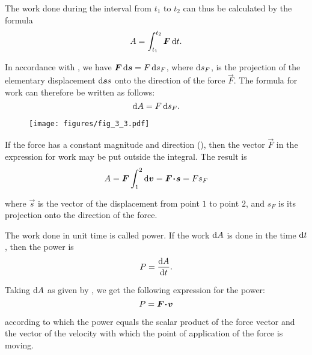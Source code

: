 \noindent
The work done during the interval from $t_1$ to $t_2$ can thus be calculated by the formula
\begin{equation}\label{eq:3_17}
A = \int_{t_1}^{t_2}\boldsymbol{F}\,\mathrm{d} t.
\end{equation}

In accordance with , we have $\boldsymbol{F}\,\mathrm{d}\boldsymbol{s}=F\,\mathrm{d} s_F$, where $\mathrm{d} s_F$, is the projection of the elementary displacement $\mathrm{d}\boldsymbol{s}s$ onto the direction of the force $\vec{F}$. The formula for work can therefore be written as follows:
\begin{equation}\label{eq:3_18}
\mathrm{d} A = F\,\mathrm{d} s_F.
\end{equation}

\begin{figure}[t]
	\begin{center}
		\texttt{[image: figures/fig\_3\_3.pdf]}
		\caption[]{}
		\label{fig:3_3}
	\end{center}
	\vspace{-0.7cm}
\end{figure}

If the force has a constant magnitude and direction (), then the vector $\vec{F}$ in the expression for work may be put outside the integral. The result is
\begin{equation}\label{eq:3_19}
A = \boldsymbol{F}\int_{1}^{2}\mathrm{d}\boldsymbol{v} = \boldsymbol{F\!\cdot\!s} = F s_F
\end{equation}

\noindent
where $\vec{s}$ is the vector of the displacement from point $1$ to point $2$, and $s_F$ is its projection onto the direction of the force.

The work done in unit time is called power. If the work $\mathrm{d} A$ is done in the time $\mathrm{d} t$, then the power is
\begin{equation}\label{eq:3_20}
P = \frac{\mathrm{d} A}{\mathrm{d} t}.
\end{equation}

\noindent
Taking $\mathrm{d} A$ as given by , we get the following expression for the power:
\begin{equation}\label{eq:3_21}
P = \boldsymbol{F\!\cdot\!v}
\end{equation}

\noindent
according to which the power equals the scalar product of the force vector and the vector of the velocity with which the point of application of the force is moving.

